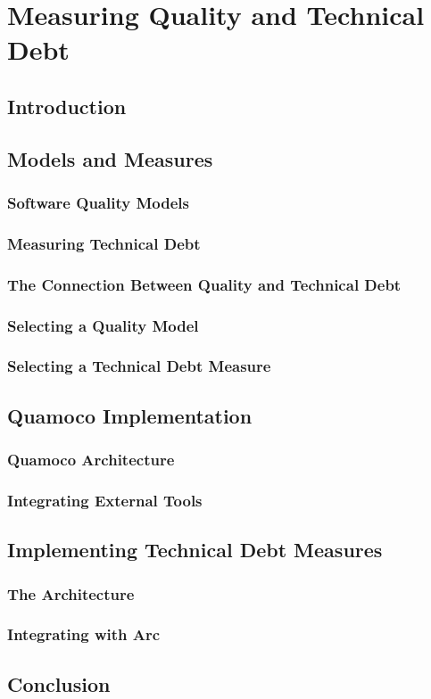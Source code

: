 \chapter{Measuring Quality and Technical Debt}

\section{Introduction}

\section{Models and Measures}

\subsection{Software Quality Models}

\subsection{Measuring Technical Debt}

\subsection{The Connection Between Quality and Technical Debt}

\subsection{Selecting a Quality Model}

\subsection{Selecting a Technical Debt Measure}

\section{Quamoco Implementation}

\subsection{Quamoco Architecture}

\subsection{Integrating External Tools}

\section{Implementing Technical Debt Measures}

\subsection{The Architecture}

\subsection{Integrating with Arc}

\section{Conclusion}